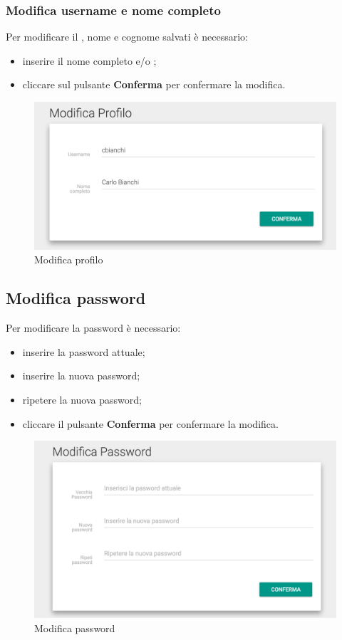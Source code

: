 \documentclass[12pt,a4paper]{article}
\begin{document}
	\subsubsection{Modifica username e nome completo}
	Per modificare il , nome e cognome salvati è necessario:
	\begin{itemize}
		\item inserire il nome completo e/o ;
		\item cliccare sul pulsante \textbf{Conferma} per confermare la modifica.
	\end{itemize}
	\begin{figure}[h]	
		\centering
		\includegraphics[width=1.0\linewidth]{../img/screenshot/user1.png}
		\caption{Modifica profilo}
		\label{Modifica profilo}
	\end{figure}

	
	\subsection{Modifica password}
	Per modificare la password  è necessario:
	\begin{itemize}
		\item inserire la password attuale;
		\item inserire la nuova password;
		\item ripetere la nuova password;
		\item cliccare il pulsante \textbf{Conferma} per confermare la modifica.
	\end{itemize}
	\begin{figure}[h]
		\centering
		\includegraphics[width=1.0\linewidth]{../img/screenshot/user2.png}
		\caption{Modifica password}
		\label{Modifica password}
	\end{figure}
	
\end{document}
